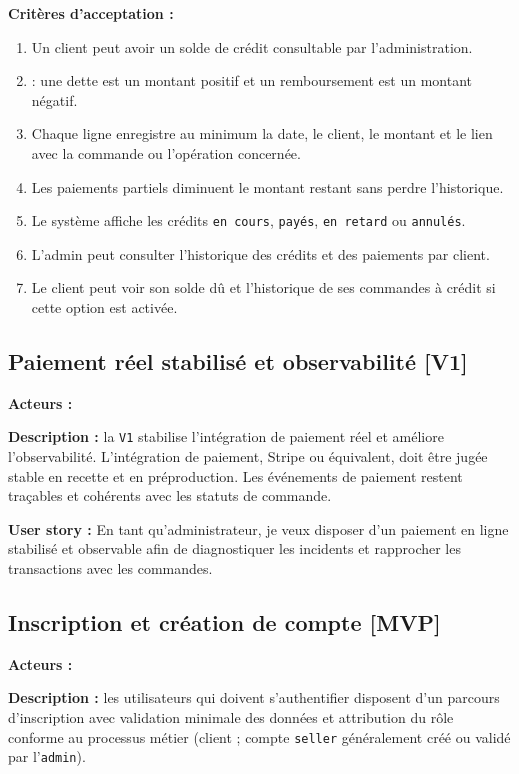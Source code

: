 \documentclass[11pt,a4paper]{scrreprt}
\newcommand{\code}[1]{\texttt{#1}}
\newcommand{\phase}[1]{\textbf{\textcolor{SplinAmber}{#1}}}
\newcommand{\actorbadge}[1]{\highlight{\code{#1}}}
\begin{document}
\textbf{Critères d'acceptation :}
\begin{enumerate}
  \item Un client peut avoir un solde de crédit consultable par l'administration.
  \item {} : une dette est un montant positif et un remboursement est un montant négatif.
  \item Chaque ligne enregistre au minimum la date, le client, le montant et le lien avec la commande ou l'opération concernée.
  \item Les paiements partiels diminuent le montant restant sans perdre l'historique.
  \item Le système affiche les crédits \code{en cours}, \code{payés}, \code{en retard} ou \code{annulés}.
  \item L'admin peut consulter l'historique des crédits et des paiements par client.
  \item Le client peut voir son solde dû et l'historique de ses commandes à crédit si cette option est activée.
\end{enumerate}

\subsection{Paiement réel stabilisé et observabilité \phase{[V1]}}
\textbf{Acteurs :} \actorbadge{ADMIN} \actorbadge{SYSTEM}

\textbf{Description :} la \code{V1} stabilise l'intégration de paiement réel et améliore l'observabilité. L'intégration de paiement, Stripe ou équivalent, doit être jugée stable en recette et en préproduction. Les événements de paiement restent traçables et cohérents avec les statuts de commande.

\textbf{User story :} En tant qu'administrateur, je veux disposer d'un paiement en ligne stabilisé et observable afin de diagnostiquer les incidents et rapprocher les transactions avec les commandes.

\subsection{Inscription et création de compte \phase{[MVP]}}
\textbf{Acteurs :} \actorbadge{CUSTOMER} \actorbadge{SELLER} \actorbadge{ADMIN}

\textbf{Description :} les utilisateurs qui doivent s'authentifier disposent d'un parcours d'inscription avec validation minimale des données et attribution du rôle conforme au processus métier (client ; compte \code{seller} généralement créé ou validé par l'\code{admin}).
\end{document}

